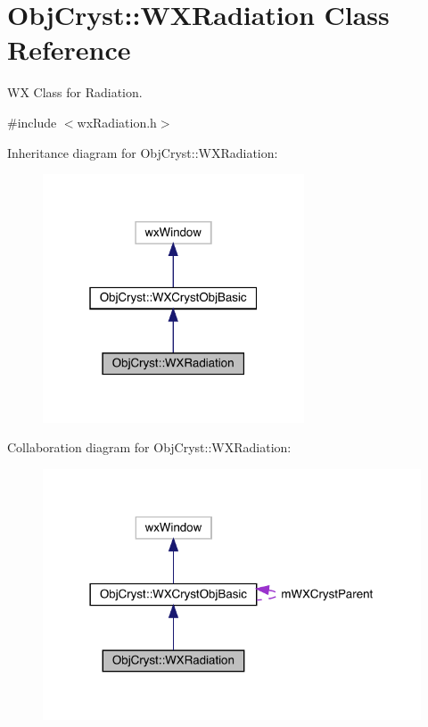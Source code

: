 \hypertarget{class_obj_cryst_1_1_w_x_radiation}{}\section{Obj\+Cryst\+::W\+X\+Radiation Class Reference}
\label{class_obj_cryst_1_1_w_x_radiation}


WX Class for Radiation.  




{\ttfamily \#include $<$wx\+Radiation.\+h$>$}



Inheritance diagram for Obj\+Cryst\+::W\+X\+Radiation\+:
\nopagebreak
\begin{figure}[H]
\begin{center}
\leavevmode
\includegraphics[width=220pt]{class_obj_cryst_1_1_w_x_radiation__inherit__graph}
\end{center}
\end{figure}


Collaboration diagram for Obj\+Cryst\+::W\+X\+Radiation\+:
\nopagebreak
\begin{figure}[H]
\begin{center}
\leavevmode
\includegraphics[width=318pt]{class_obj_cryst_1_1_w_x_radiation__coll__graph}
\end{center}
\end{figure}
